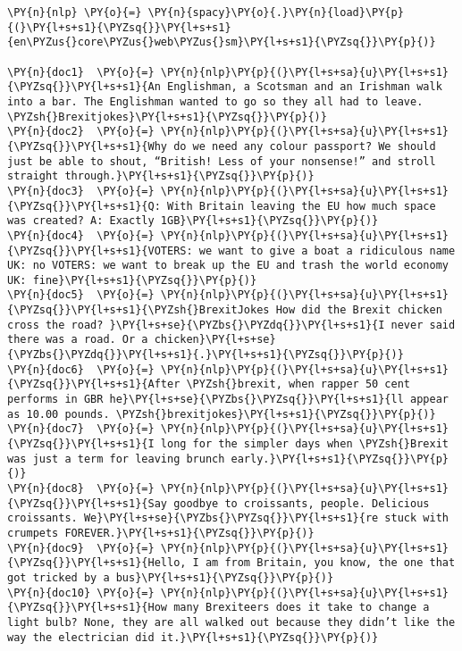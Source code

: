     \begin{tcolorbox}[breakable, size=fbox, boxrule=1pt, pad at break*=1mm,colback=cellbackground, colframe=cellborder]
\begin{Verbatim}[commandchars=\\\{\}]
\PY{n}{nlp} \PY{o}{=} \PY{n}{spacy}\PY{o}{.}\PY{n}{load}\PY{p}{(}\PY{l+s+s1}{\PYZsq{}}\PY{l+s+s1}{en\PYZus{}core\PYZus{}web\PYZus{}sm}\PY{l+s+s1}{\PYZsq{}}\PY{p}{)}

\PY{n}{doc1}  \PY{o}{=} \PY{n}{nlp}\PY{p}{(}\PY{l+s+sa}{u}\PY{l+s+s1}{\PYZsq{}}\PY{l+s+s1}{An Englishman, a Scotsman and an Irishman walk into a bar. The Englishman wanted to go so they all had to leave. \PYZsh{}Brexitjokes}\PY{l+s+s1}{\PYZsq{}}\PY{p}{)}
\PY{n}{doc2}  \PY{o}{=} \PY{n}{nlp}\PY{p}{(}\PY{l+s+sa}{u}\PY{l+s+s1}{\PYZsq{}}\PY{l+s+s1}{Why do we need any colour passport? We should just be able to shout, “British! Less of your nonsense!” and stroll straight through.}\PY{l+s+s1}{\PYZsq{}}\PY{p}{)}
\PY{n}{doc3}  \PY{o}{=} \PY{n}{nlp}\PY{p}{(}\PY{l+s+sa}{u}\PY{l+s+s1}{\PYZsq{}}\PY{l+s+s1}{Q: With Britain leaving the EU how much space was created? A: Exactly 1GB}\PY{l+s+s1}{\PYZsq{}}\PY{p}{)}
\PY{n}{doc4}  \PY{o}{=} \PY{n}{nlp}\PY{p}{(}\PY{l+s+sa}{u}\PY{l+s+s1}{\PYZsq{}}\PY{l+s+s1}{VOTERS: we want to give a boat a ridiculous name UK: no VOTERS: we want to break up the EU and trash the world economy UK: fine}\PY{l+s+s1}{\PYZsq{}}\PY{p}{)}
\PY{n}{doc5}  \PY{o}{=} \PY{n}{nlp}\PY{p}{(}\PY{l+s+sa}{u}\PY{l+s+s1}{\PYZsq{}}\PY{l+s+s1}{\PYZsh{}BrexitJokes How did the Brexit chicken cross the road? }\PY{l+s+se}{\PYZbs{}\PYZdq{}}\PY{l+s+s1}{I never said there was a road. Or a chicken}\PY{l+s+se}{\PYZbs{}\PYZdq{}}\PY{l+s+s1}{.}\PY{l+s+s1}{\PYZsq{}}\PY{p}{)}
\PY{n}{doc6}  \PY{o}{=} \PY{n}{nlp}\PY{p}{(}\PY{l+s+sa}{u}\PY{l+s+s1}{\PYZsq{}}\PY{l+s+s1}{After \PYZsh{}brexit, when rapper 50 cent performs in GBR he}\PY{l+s+se}{\PYZbs{}\PYZsq{}}\PY{l+s+s1}{ll appear as 10.00 pounds. \PYZsh{}brexitjokes}\PY{l+s+s1}{\PYZsq{}}\PY{p}{)}
\PY{n}{doc7}  \PY{o}{=} \PY{n}{nlp}\PY{p}{(}\PY{l+s+sa}{u}\PY{l+s+s1}{\PYZsq{}}\PY{l+s+s1}{I long for the simpler days when \PYZsh{}Brexit was just a term for leaving brunch early.}\PY{l+s+s1}{\PYZsq{}}\PY{p}{)}
\PY{n}{doc8}  \PY{o}{=} \PY{n}{nlp}\PY{p}{(}\PY{l+s+sa}{u}\PY{l+s+s1}{\PYZsq{}}\PY{l+s+s1}{Say goodbye to croissants, people. Delicious croissants. We}\PY{l+s+se}{\PYZbs{}\PYZsq{}}\PY{l+s+s1}{re stuck with crumpets FOREVER.}\PY{l+s+s1}{\PYZsq{}}\PY{p}{)}
\PY{n}{doc9}  \PY{o}{=} \PY{n}{nlp}\PY{p}{(}\PY{l+s+sa}{u}\PY{l+s+s1}{\PYZsq{}}\PY{l+s+s1}{Hello, I am from Britain, you know, the one that got tricked by a bus}\PY{l+s+s1}{\PYZsq{}}\PY{p}{)}
\PY{n}{doc10} \PY{o}{=} \PY{n}{nlp}\PY{p}{(}\PY{l+s+sa}{u}\PY{l+s+s1}{\PYZsq{}}\PY{l+s+s1}{How many Brexiteers does it take to change a light bulb? None, they are all walked out because they didn’t like the way the electrician did it.}\PY{l+s+s1}{\PYZsq{}}\PY{p}{)}


\end{Verbatim}
\end{tcolorbox}
